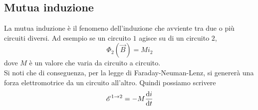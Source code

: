 \subsection{Mutua induzione}
La mutua induzione è il fenomeno dell'induzione che avviente tra due o più circuiti diversi. Ad
esempio se un circuito $1$ agisce su di un circuito $2$,
\begin{equation*}
  \Phi_2(\vec{B}) = Mi_2
\end{equation*}
dove $M$ è un valore che varia da circuito a circuito.\\
Si noti che di conseguenza, per la legge di Faraday-Neuman-Lenz, si genererà una forza 
elettromotrice da un circuito all'altro. Quindi possiamo scrivere
\begin{equation*}
  \mathcal{E}^{1\to2}= - M \frac{\mathop{}\!\mathrm{d} i}{\mathop{}\!\mathrm{d} t}
\end{equation*}


